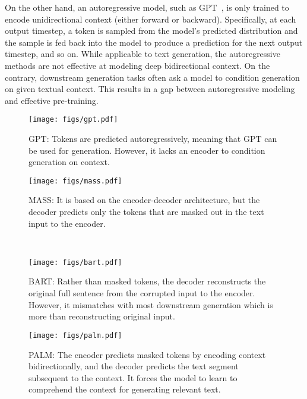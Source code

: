 \documentclass[11pt,a4paper]{article}
\newcommand{\method}{PALM\xspace}
\begin{document}
On the other hand, an autoregressive model, such as GPT~\cite{Radford2018ImprovingLU,gpt2}, is only trained to encode unidirectional context (either forward or backward). Specifically, at each output timestep, a token is sampled from the model’s predicted distribution and the sample is fed back into the model to produce a prediction for the next output timestep, and so on. While applicable to text generation, the autoregressive methods are not effective at modeling deep bidirectional context. On the contrary, downstream generation tasks often ask a model to condition generation on given textual context. This results in a gap between autoregressive modeling and effective pre-training.

\begin{figure*}[t]
     \centering
     \begin{subfigure}{0.47\textwidth}
         \centering
         \texttt{[image: figs/gpt.pdf]}
         \caption{GPT: Tokens are predicted autoregressively, meaning that GPT can be used for generation. However, it lacks an encoder to condition generation on context.}
         \label{fig:gpt}
     \end{subfigure}
     \hfill
     \begin{subfigure}{0.47\textwidth}
         \centering
         \texttt{[image: figs/mass.pdf]}
         \caption{MASS: It is based on the encoder-decoder architecture, but the decoder predicts only the tokens that are masked out in the text input to the encoder.}
         \label{fig:mass}
     \end{subfigure}
     \bigskip\\
     \begin{subfigure}{0.47\textwidth}
         \centering
         \texttt{[image: figs/bart.pdf]}
         \caption{BART: Rather than masked tokens, the decoder reconstructs the original full sentence from the corrupted input to the encoder. However, it mismatches with most downstream generation which is more than reconstructing original input.}
         \label{fig:bart}
     \end{subfigure}
     \hfill
     \begin{subfigure}{0.47\textwidth}
         \centering
         \texttt{[image: figs/palm.pdf]}
         \caption{\method: The encoder predicts masked tokens by encoding context bidirectionally, and the decoder predicts the text segment subsequent to the context. It forces the model to learn to comprehend the context for generating relevant text.}
         \label{fig:palm}
     \end{subfigure}
     \caption{A schematic comparison of \method with GPT, MASS and BART.}
     \label{fig:comparison}
\end{figure*}
\end{document}
